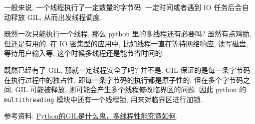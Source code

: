 一般来说, 一个线程执行了一定数量的字节码, 一定时间或者遇到 IO 任务后会自动释放 GIL, 从而出发线程调度. 

既然一次只能执行一个线程, 那么 python 里的多线程还有必要吗? 虽然有点鸡肋, 但还是有用的. 在 IO 密集型的应用中, 比如线程一直在等待网络响应, 读写磁盘, 等待用户输入等, 这个时候多线程还是能节省时间的.

既然已经有了 GIL, 那就一定线程安全了吗? 并不是. GIL 保证的是每一条字节码在执行过程中的独占性, 即每一条字节码的执行都是原子性的. 但在多个字节码之间, GIL 可能被释放, 则可能会产生多个线程修改临界区的问题. 因此 python 的 \texttt{multithreading} 模块中还有一个线程锁, 用来对临界区进行加锁.

参考资料: \href{http://cenalulu.github.io/python/gil-in-python/#:~:text=GIL%E5%85%A8%E7%A7%B0Global%20Interpreter%20Lock%E4%B8%BA%E4%BA%86%E9%81%BF%E5%85%8D%E8%AF%AF%E5%AF%BC%EF%BC%8C%E6%88%91%E4%BB%AC%E8%BF%98%E6%98%AF%E6%9D%A5%E7%9C%8B%E4%B8%80%E4%B8%8B%E5%AE%98%E6%96%B9%E7%BB%99%E5%87%BA%E7%9A%84%E8%A7%A3%E9%87%8A%EF%BC%9A%20In%20CPython%2C%20the%20global%20interpreter,mainly%20because%20CPython%E2%80%99s%20memory%20management%20is%20not%20thread-safe.}{Python的GIL是什么鬼，多线程性能究竟如何}.
